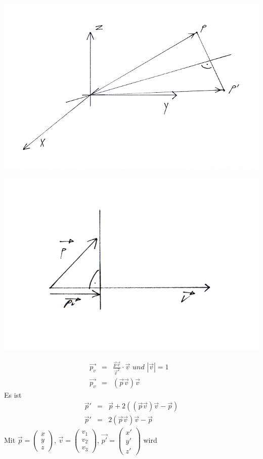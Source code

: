 \documentclass[a4paper,10pt]{report}
\begin{document}
\begin{center}
	 \includegraphics[width=\textwidth]{imgs/R3spiegelungGeraden2.png}
\end{center}
\begin{center}
	 \includegraphics[width=\textwidth]{imgs/R3spiegelungGeraden3.png}
\end{center}
\begin{eqnarray*}
\vec{p_v} &=& \frac{\vec{p}\vec{v}}{\vec{v}^2}\cdot\vec{v} \textit{ und $|\vec{v}|=1$ }\\
\vec{p_v} &=& (\vec{p}\vec{v})\vec{v}
\end{eqnarray*}
Es ist 
\begin{eqnarray*}
\vec{p}' &=& \vec{p} + 2((\vec{p}\vec{v})\vec{v}-\vec{p})\\
\vec{p}' &=& 2(\vec{p}\vec{v})\vec{v}-\vec{p}
\end{eqnarray*}
Mit $\vec{p}=\begin{pmatrix}x\\y\\z\end{pmatrix}$, $\vec{v}=\begin{pmatrix}v_1\\v_2\\v_3\end{pmatrix}$, $\vec{p'}=\begin{pmatrix}x'\\y'\\z'\end{pmatrix}$ wird
\end{document}
